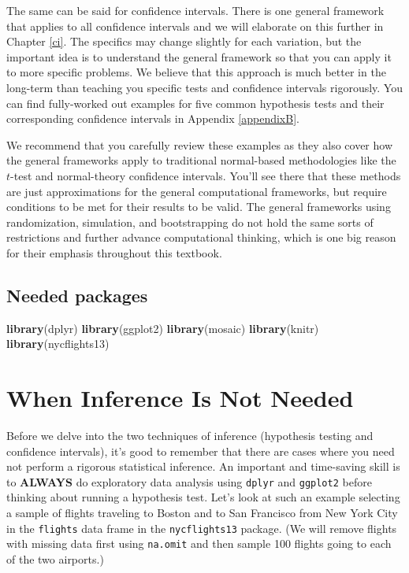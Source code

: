 \documentclass[]{tufte-book}
\newenvironment{Shaded}{\begin{snugshade}}{\end{snugshade}}
\newcommand{\KeywordTok}[1]{\textcolor[rgb]{0.13,0.29,0.53}{\textbf{{#1}}}}
\newcommand{\NormalTok}[1]{{#1}}
\theoremstyle{definition}
\theoremstyle{definition}
\theoremstyle{remark}
\begin{document}
The same can be said for confidence intervals. There is one general
framework that applies to all confidence intervals and we will elaborate
on this further in Chapter \ref{ci}. The specifics may change slightly
for each variation, but the important idea is to understand the general
framework so that you can apply it to more specific problems. We believe
that this approach is much better in the long-term than teaching you
specific tests and confidence intervals rigorously. You can find
fully-worked out examples for five common hypothesis tests and their
corresponding confidence intervals in Appendix \ref{appendixB}.

We recommend that you carefully review these examples as they also cover
how the general frameworks apply to traditional normal-based
methodologies like the \(t\)-test and normal-theory confidence
intervals. You'll see there that these methods are just approximations
for the general computational frameworks, but require conditions to be
met for their results to be valid. The general frameworks using
randomization, simulation, and bootstrapping do not hold the same sorts
of restrictions and further advance computational thinking, which is one
big reason for their emphasis throughout this textbook.

\subsection*{Needed packages}\label{needed-packages-4}

\begin{Shaded}
\begin{Highlighting}[]
\KeywordTok{library}\NormalTok{(dplyr)}
\KeywordTok{library}\NormalTok{(ggplot2)}
\KeywordTok{library}\NormalTok{(mosaic)}
\KeywordTok{library}\NormalTok{(knitr)}
\KeywordTok{library}\NormalTok{(nycflights13)}
\end{Highlighting}
\end{Shaded}

\section{When Inference Is Not
Needed}\label{when-inference-is-not-needed}

Before we delve into the two techniques of inference (hypothesis testing
and confidence intervals), it's good to remember that there are cases
where you need not perform a rigorous statistical inference. An
important and time-saving skill is to \textbf{ALWAYS} do exploratory
data analysis using \texttt{dplyr} and \texttt{ggplot2} before thinking
about running a hypothesis test. Let's look at such an example selecting
a sample of flights traveling to Boston and to San Francisco from New
York City in the \texttt{flights} data frame in the
\texttt{nycflights13} package. (We will remove flights with missing data
first using \texttt{na.omit} and then sample 100 flights going to each
of the two airports.)
\end{document}
